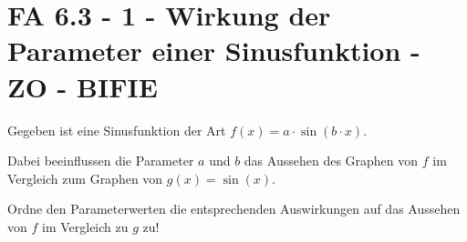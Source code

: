 \section{FA 6.3 - 1 - Wirkung der Parameter einer Sinusfunktion - ZO - BIFIE}

\begin{beispiel}[FA 6.3]{1} %
				Gegeben ist eine Sinusfunktion der Art $f(x)=a\cdot \sin(b\cdot x)$.

Dabei beeinflussen die Parameter $a$ und $b$ das Aussehen des Graphen von $f$ im Vergleich zum Graphen von $g(x)=\sin(x)$.

Ordne den Parameterwerten die entsprechenden Auswirkungen auf das Aussehen von $f$ im Vergleich zu $g$ zu!

\end{beispiel}